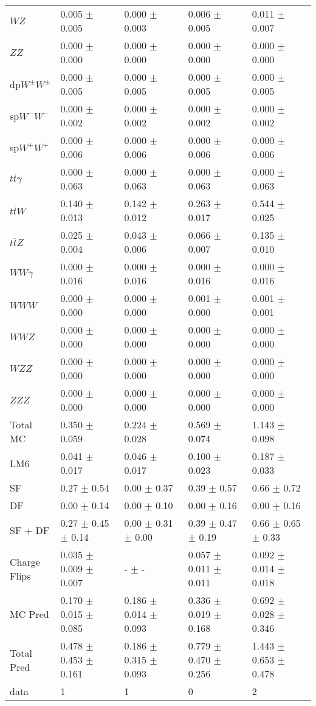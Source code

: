 \begin{tabular}{l | l l l l}
$WZ$ &  0.005 $\pm$  0.005 &  0.000 $\pm$  0.003 &  0.006 $\pm$  0.005 &  0.011 $\pm$  0.007\\
$ZZ$ &  0.000 $\pm$   0.000 &  0.000 $\pm$   0.000 &  0.000 $\pm$   0.000 &  0.000 $\pm$   0.000\\
\hline
dp$W^{\pm}W^{\pm}$ &  0.000 $\pm$  0.005 &  0.000 $\pm$  0.005 &  0.000 $\pm$  0.005 &  0.000 $\pm$  0.005\\
sp$W^{-}W^{-}$ &  0.000 $\pm$  0.002 &  0.000 $\pm$  0.002 &  0.000 $\pm$  0.002 &  0.000 $\pm$  0.002\\
sp$W^{+}W^{+}$ &  0.000 $\pm$  0.006 &  0.000 $\pm$  0.006 &  0.000 $\pm$  0.006 &  0.000 $\pm$  0.006\\
$t\overline{t}\gamma$ &  0.000 $\pm$  0.063 &  0.000 $\pm$  0.063 &  0.000 $\pm$  0.063 &  0.000 $\pm$  0.063\\
$t\overline{t}W$ &  0.140 $\pm$  0.013 &  0.142 $\pm$  0.012 &  0.263 $\pm$  0.017 &  0.544 $\pm$  0.025\\
$t\overline{t}Z$ &  0.025 $\pm$  0.004 &  0.043 $\pm$  0.006 &  0.066 $\pm$  0.007 &  0.135 $\pm$  0.010\\
$WW\gamma$ &  0.000 $\pm$  0.016 &  0.000 $\pm$  0.016 &  0.000 $\pm$  0.016 &  0.000 $\pm$  0.016\\
$WWW$ &   0.000 $\pm$   0.000 &   0.000 $\pm$   0.000 &  0.001 $\pm$   0.000 &  0.001 $\pm$  0.001\\
$WWZ$ &  0.000 $\pm$   0.000 &  0.000 $\pm$   0.000 &  0.000 $\pm$   0.000 &  0.000 $\pm$   0.000\\
$WZZ$ &  0.000 $\pm$   0.000 &  0.000 $\pm$   0.000 &  0.000 $\pm$   0.000 &  0.000 $\pm$   0.000\\
$ZZZ$ &  0.000 $\pm$   0.000 &   0.000 $\pm$   0.000 &   0.000 $\pm$   0.000 &   0.000 $\pm$   0.000\\
\hline
Total MC &  0.350 $\pm$  0.059 &  0.224 $\pm$  0.028 &  0.569 $\pm$  0.074 &  1.143 $\pm$  0.098\\
\hline\hline
\hline
LM6 &  0.041 $\pm$  0.017 &  0.046 $\pm$  0.017 &  0.100 $\pm$  0.023 &  0.187 $\pm$  0.033\\
\hline\hline
\hline\hline
 SF  & 0.27 $\pm$ 0.54 & 0.00 $\pm$ 0.37 & 0.39 $\pm$ 0.57 & 0.66 $\pm$ 0.72\\
 DF  & 0.00 $\pm$ 0.14 & 0.00 $\pm$ 0.10 & 0.00 $\pm$ 0.16 & 0.00 $\pm$ 0.16\\
\hline
 SF + DF  & 0.27 $\pm$ 0.45 $\pm$ 0.14 & 0.00 $\pm$ 0.31 $\pm$ 0.00 & 0.39 $\pm$ 0.47 $\pm$ 0.19 & 0.66 $\pm$ 0.65 $\pm$ 0.33\\
\hline\hline
Charge Flips & 0.035 $\pm$ 0.009 $\pm$ 0.007 & - $\pm$ - & 0.057 $\pm$ 0.011 $\pm$ 0.011 & 0.092 $\pm$ 0.014 $\pm$ 0.018\\
\hline\hline
\hline
MC Pred &  0.170 $\pm$  0.015 $\pm$  0.085 &  0.186 $\pm$  0.014 $\pm$  0.093 &  0.336 $\pm$  0.019 $\pm$  0.168 &  0.692 $\pm$  0.028 $\pm$  0.346\\
\hline\hline
Total Pred &  0.478 $\pm$  0.453 $\pm$  0.161 &  0.186 $\pm$  0.315 $\pm$  0.093 &  0.779 $\pm$  0.470 $\pm$  0.256 &  1.443 $\pm$  0.653 $\pm$  0.478\\
\hline\hline
data & 1 & 1 & 0 & 2\\
\hline\hline
\end{tabular}
